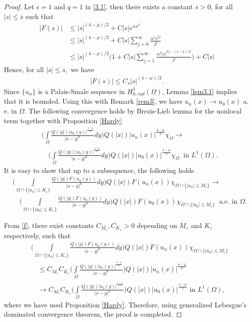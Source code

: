\documentclass[11pt]{amsart}
\numberwithin{equation}{section}
\newcommand{\hr}{H^1_{0, rad}(\Omega)}
\newcommand{\1}{\frac{1}{2}}
\begin{document}
\begin{proof}
		Let $\epsilon =1$ and $q=1$ in \eqref{3.1}, then there exists a constant $\overline{s}>0$, for all $|s| \leq \overline{s}$ such that
		\begin{align*}
			|F(s)| &\leq |s|^{(4-\mu)/2} + C|s| e^{\alpha s^2} \nonumber \\
			& \leq |s|^{(4-\mu)/2} + C|s| \sum_{j=0}^\infty \frac{\alpha^js^{2j}}{j!} \nonumber\\
			& \leq |s|^{(4-\mu)/2} \Bigg(1 + C |s|\sum_{j=1}^\infty \frac{\alpha^j|s|^{2j-(4-\mu)/2}}{j!} \Bigg) + C|s|\nonumber
		\end{align*}
		Hence, for all $|s| \leq \overline{s},$ we have
		\begin{align}
			\label{f}
			|F(s)| \leq C_{\overline{s}} |s|^{(4-\mu)/2}.
		\end{align}
		Since $\{u_n\}$ is a Palais-Smale sequence in $\hr$, Lemma \ref{lem3.1} implies that it is bounded. Using this with Remark \ref{rem3}, we have $u_n(x) \to u_0(x)$ a. e. in $\Omega$. The following convergence holds by Brezis-Lieb lemma for the nonlocal term \cite{Moroz} together with Proposition \ref{Hardy}
		\begin{align*}
			&\Bigg( \int\limits_{\Omega} \frac{Q(|y|)|u_n(y)|^{\frac{4-\mu}{2}}}{|x-y|^\mu}dy \Bigg) Q(|x|)|u_n(x)|^{\frac{4-\mu}{2}} \chi_{\Omega} \to \nonumber\\
			&\quad \Bigg( \int\limits_{\Omega} \frac{Q(|y|)|u_0(y)|^{\frac{4-\mu}{2}}}{|x-y|^\mu}dy \Bigg) Q(|x|)|u_0(x)|^{\frac{4-\mu}{2}} \chi_{\Omega} \ \text{ in } L^1(\Omega).
		\end{align*}
		It is easy to show that up to a subsequence, the following holds 
		\begin{align*}
			&\Bigg( \int\limits_{\Omega \cap \{ |u_n| \leq K_\varepsilon\}} \frac{Q(|y|)F(u_n(y))}{|x-y|^\mu}dy \Bigg) Q(|x|)F(u_n(x)) \chi_{\Omega \cap \{ |u_n| \leq M_\varepsilon\}} \to \nonumber \\
			& \quad \Bigg( \int\limits_{\Omega \cap \{|u_0| \leq K_\varepsilon\}} \frac{Q(|y|)F(u_0(y))}{|x-y|^\mu}dy \Bigg) Q(|x|)F(u_0(x)) \chi_{\Omega \cap \{|u_0| \leq M_\varepsilon\}} \ \text{ a.e. in } \Omega. \label{s}
		\end{align*}
		
		From \eqref{f}, there exist constants $C_{M_\varepsilon}, C_{K_\varepsilon}>0$ depending on $M_\varepsilon$ and $K_\varepsilon$ respectively, such that
		\begin{align*}
			& \Bigg( \int\limits_{\Omega \cap \{ |u_n| \leq K_\varepsilon\}} \frac{Q(|y|)F(u_n(y))}{|x-y|^\mu}dy \Bigg) Q(|x|)F(u_n(x)) \chi_{\Omega \cap \{ |u_n| \leq M_\varepsilon\}}\\
			& \quad \leq C_{M_\varepsilon} C_{K_\varepsilon} \Bigg( \int\limits_{\Omega } \frac{Q(|y|) |u_n(y)|^{\frac{4-\mu}{2}}}{|x-y|^\mu}\Bigg) Q(|x|) |u_n(x)|^{\frac{4-\mu}{2}} \\
			& \quad \to C_{M_\varepsilon} C_{K_\varepsilon} \Bigg( \int\limits_{\Omega } \frac{Q(|y|) |u_0(y)|^{\frac{4-\mu}{2}}}{|x-y|^\mu}\Bigg) Q(|x|) |u_0(x)|^{\frac{4-\mu}{2}} \text{ in } L^1(\Omega),
		\end{align*}
		where we have used Proposition \ref{Hardy}. Therefore, using generalized Lebesgue's dominated convergence theorem, the proof is completed.
		

\end{proof}
\end{document}
